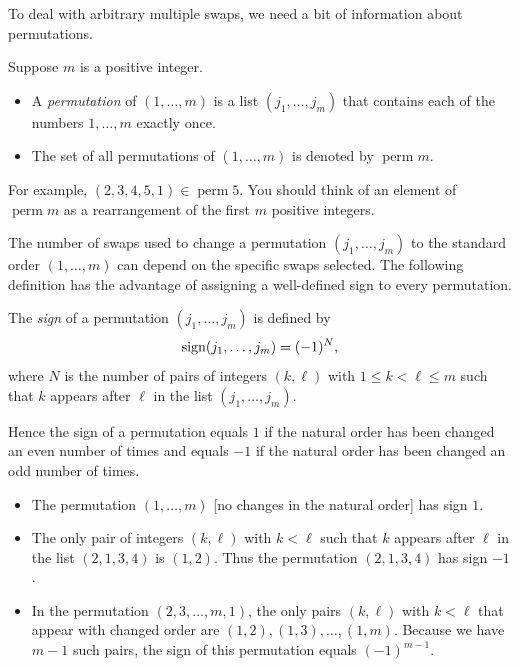To deal with arbitrary multiple swaps, we need a bit of information about
permutations.

\begin{definition}\label{ax:9.31}
Suppose $m$ is a positive integer.
\begin{itemize}
\item A \emph{permutation} of $(1,\dots,m)$ is a list $(j_1,\dots,j_m)$ that
  contains each of the numbers $1,\dots,m$ exactly once.
\item The set of all permutations of $(1,\dots,m)$ is denoted by
  $\operatorname{perm} m$.
\end{itemize}
\end{definition}

For example, $(2,3,4,5,1)\in\operatorname{perm} 5$. You should think of an
element of $\operatorname{perm} m$ as a rearrangement of the first $m$
positive integers.

The number of swaps used to change a permutation $(j_1,\dots,j_m)$ to the
standard order $(1,\dots,m)$ can depend on the specific swaps selected. The
following definition has the advantage of assigning a well-defined sign to
every permutation.

\begin{definition}\label{ax:9.32}
The \emph{sign} of a permutation $(j_1,\dots,j_m)$ is defined by
\[ \operatorname{sign}(j_1,\dots,j_m) = (-1)^N, \]
where $N$ is the number of pairs of integers $(k,\ell)$ with
$1\le k<\ell\le m$ such that $k$ appears after $\ell$ in the list
$(j_1,\dots,j_m)$.
\end{definition}

Hence the sign of a permutation equals $1$ if the natural order has been
changed an even number of times and equals $-1$ if the natural order has been
changed an odd number of times.

\begin{example}[Signs]\label{ax:9.33}\leavevmode
\begin{itemize}
\item The permutation $(1,\dots,m)$ [no changes in the natural order] has
  sign $1$.
\item The only pair of integers $(k,\ell)$ with $k<\ell$ such that $k$
  appears after $\ell$ in the list $(2,1,3,4)$ is $(1,2)$. Thus the
  permutation $(2,1,3,4)$ has sign $-1$.
\item In the permutation $(2,3,\dots,m,1)$, the only pairs $(k,\ell)$ with
  $k<\ell$ that appear with changed order are $(1,2),(1,3),\dots,(1,m)$.
  Because we have $m-1$ such pairs, the sign of this permutation equals
  $(-1)^{m-1}$.
\end{itemize}
\end{example}

